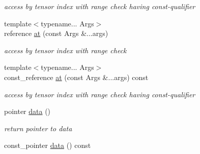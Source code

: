 \begin{DoxyCompactItemize}
\begin{DoxyCompactList}\small\item\em access by tensor index with range check having const-\/qualifier \item\end{DoxyCompactList}\item 
\hypertarget{classbtas_1_1_tensor_3_01_t_00_010ul_00_01_order_01_4_ad647d7897e6aa36a2e4803b98fb1bc6d}{
{\footnotesize template$<$typename... Args$>$ }\\reference \hyperlink{classbtas_1_1_tensor_3_01_t_00_010ul_00_01_order_01_4_ad647d7897e6aa36a2e4803b98fb1bc6d}{at} (const Args \&...args)}
\label{classbtas_1_1_tensor_3_01_t_00_010ul_00_01_order_01_4_ad647d7897e6aa36a2e4803b98fb1bc6d}

\begin{DoxyCompactList}\small\item\em access by tensor index with range check \item\end{DoxyCompactList}\item 
\hypertarget{classbtas_1_1_tensor_3_01_t_00_010ul_00_01_order_01_4_a0d66a63942dcddd56a0299fdd2490135}{
{\footnotesize template$<$typename... Args$>$ }\\const\_\-reference \hyperlink{classbtas_1_1_tensor_3_01_t_00_010ul_00_01_order_01_4_a0d66a63942dcddd56a0299fdd2490135}{at} (const Args \&...args) const }
\label{classbtas_1_1_tensor_3_01_t_00_010ul_00_01_order_01_4_a0d66a63942dcddd56a0299fdd2490135}

\begin{DoxyCompactList}\small\item\em access by tensor index with range check having const-\/qualifier \item\end{DoxyCompactList}\item 
\hypertarget{classbtas_1_1_tensor_3_01_t_00_010ul_00_01_order_01_4_a72f6052ed98b8056b9233c7664cab042}{
pointer \hyperlink{classbtas_1_1_tensor_3_01_t_00_010ul_00_01_order_01_4_a72f6052ed98b8056b9233c7664cab042}{data} ()}
\label{classbtas_1_1_tensor_3_01_t_00_010ul_00_01_order_01_4_a72f6052ed98b8056b9233c7664cab042}

\begin{DoxyCompactList}\small\item\em return pointer to data \item\end{DoxyCompactList}\item 
\hypertarget{classbtas_1_1_tensor_3_01_t_00_010ul_00_01_order_01_4_aa0c300d4f4b38690a075eb8308602f10}{
const\_\-pointer \hyperlink{classbtas_1_1_tensor_3_01_t_00_010ul_00_01_order_01_4_aa0c300d4f4b38690a075eb8308602f10}{data} () const }
\label{classbtas_1_1_tensor_3_01_t_00_010ul_00_01_order_01_4_aa0c300d4f4b38690a075eb8308602f10}


\end{DoxyCompactItemize}
